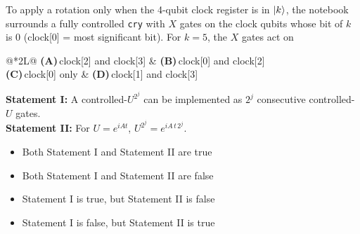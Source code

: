 \documentclass[11pt,a4paper]{article}
\newcommand{\optlabel}[1]{\textbf{(#1)}}
\newenvironment{qitem}[1]{\begin{list}{}{\setlength{\leftmargin}{3.3em}\setlength{\labelwidth}{3.1em}%
  \setlength{\labelsep}{0.2em}\setlength{\topsep}{3pt}\setlength{\parsep}{3pt}}\item[\textbf{Q.#1}\hfill]}{\end{list}}
\newcommand{\qsep}{\par\vspace{2pt}{\color{black!15}\hrule}\vspace{4pt}}
\begin{document}
\begin{qitem}{28}
To apply a rotation only when the 4-qubit clock register is in $\ket k$, the notebook surrounds a fully controlled \texttt{cry} with $X$ gates on the clock qubits whose bit of $k$ is
0 (clock[0] = most significant bit). For $k = 5$, the $X$ gates act on
\par\smallskip\noindent\begin{tabularx}{\linewidth}{@{}*{2}{L}@{}}
\optlabel{A}\,clock[2] and clock[3] & \optlabel{B}\,clock[0] and clock[2] \\[3pt]
\optlabel{C}\,clock[0] only & \optlabel{D}\,clock[1] and clock[3]
\end{tabularx}
\end{qitem}
\qsep

\begin{qitem}{29}
\textbf{Statement I:} A controlled-$U^{2^j}$ can be implemented as $2^j$ consecutive controlled-$U$ gates.\\[1mm]
\textbf{Statement II:} For $U = e^{iAt}$, $U^{2^j} = e^{iA\,t\,2^j}$.
\begin{itemize}[leftmargin=2.6em, labelsep=0.4em, itemsep=2pt, topsep=3pt]
\item[\optlabel{A}] Both Statement I and Statement II are true
\item[\optlabel{B}] Both Statement I and Statement II are false
\item[\optlabel{C}] Statement I is true, but Statement II is false
\item[\optlabel{D}] Statement I is false, but Statement II is true
\end{itemize}
\end{qitem}
\qsep
\end{document}
